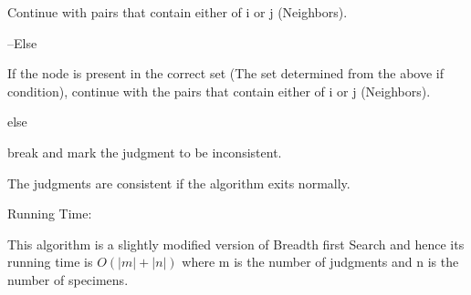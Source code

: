 \documentclass[letterpaper,portrait,12pt]{article}
\begin{document}
\begin{flushleft}
	Continue with pairs that contain either of i or j (Neighbors).
\end{flushleft}


\begin{flushleft}
	
\end{flushleft}


\begin{flushleft}
	--Else
\end{flushleft}


\begin{flushleft}
		If the node is present in the correct set (The set determined from the above if condition), continue with the pairs that contain either of i or j (Neighbors).
\end{flushleft}


\begin{flushleft}
		else
\end{flushleft}


\begin{flushleft}
			break and mark the judgment to be inconsistent.
\end{flushleft}


\begin{flushleft}

\end{flushleft}


\begin{flushleft}

\end{flushleft}


\begin{flushleft}
The judgments are consistent if the algorithm exits normally.
\end{flushleft}


\begin{flushleft}

\end{flushleft}


\begin{flushleft}
Running Time: 
\end{flushleft}


\begin{flushleft}
	This algorithm is a slightly modified version of Breadth first Search and hence its running time is $O(|m|+|n|)$ where m is the number of judgments and n is the number of specimens.
\end{flushleft}


\begin{flushleft}

\end{flushleft}
\end{document}
